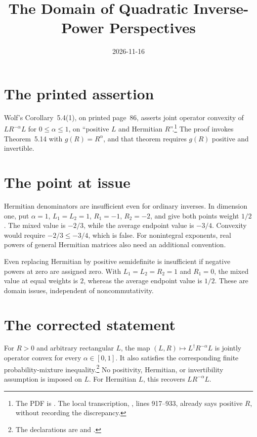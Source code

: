\documentclass{article}
\title{The Domain of Quadratic Inverse-Power Perspectives}
\author{}
\date{2026-11-16}
\begin{document}
\maketitle
{}

\section{The printed assertion}
Wolf's Corollary~5.4(1), on printed page~86, asserts joint operator convexity
of $LR^{-\alpha}L$ for $0\leq\alpha\leq1$, on ``positive $L$ and Hermitian
$R$''.\footnote{The PDF is
.
The local transcription,
, lines 917--933,
already says positive $R$, without recording the discrepancy.}
The proof invokes Theorem~5.14 with $g(R)=R^\alpha$, and that theorem requires
$g(R)$ positive and invertible.

\section{The point at issue}
Hermitian denominators are insufficient even for ordinary inverses. In dimension
one, put $\alpha=1$, $L_1=L_2=1$, $R_1=-1$, $R_2=-2$, and give both points
weight $1/2$. The mixed value is $-2/3$, while the average endpoint value is
$-3/4$. Convexity would require $-2/3\leq-3/4$, which is false.
For nonintegral exponents, real powers of general Hermitian matrices also need
an additional convention.

Even replacing Hermitian by positive semidefinite is insufficient if negative
powers at zero are assigned zero. With $L_1=L_2=R_2=1$ and $R_1=0$,
the mixed value at equal weights is $2$, whereas the average endpoint value is
$1/2$. These are domain issues, independent of noncommutativity.

\section{The corrected statement}
For $R>0$ and arbitrary rectangular $L$, the map
$(L,R)\mapsto L^\dagger R^{-\alpha}L$ is jointly operator convex for every
$\alpha\in[0,1]$. It also satisfies the corresponding finite probability-mixture
inequality.\footnote{The declarations are
 and
.}
No positivity, Hermitian, or invertibility assumption is imposed on $L$.
For Hermitian $L$, this recovers $LR^{-\alpha}L$.
\end{document}
